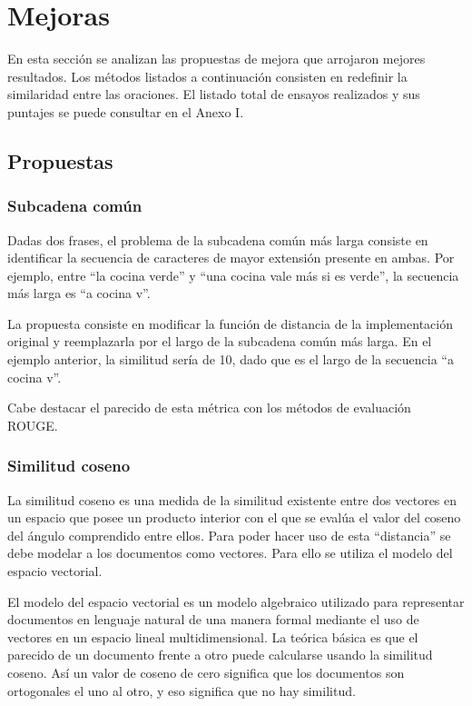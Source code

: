 \documentclass[a4paper]{article}
\begin{document}
\section{Mejoras}
En esta sección se analizan las propuestas de mejora que arrojaron mejores resultados. Los métodos listados a continuación consisten en redefinir la similaridad entre las oraciones. El listado total de ensayos realizados y sus puntajes se puede consultar en el Anexo I.

\subsection{Propuestas}

\subsubsection{Subcadena común}
Dadas dos frases, el problema de la subcadena común más larga consiste en identificar la secuencia de caracteres de mayor extensión presente en ambas. Por ejemplo, entre “la cocina verde” y “una cocina vale más si es verde”, la secuencia más larga es “a cocina v”.

La propuesta consiste en modificar la función de distancia de la implementación original y reemplazarla por el largo de la subcadena común más larga. En el ejemplo anterior, la similitud sería de 10, dado que es el largo de la secuencia “a cocina v”.

Cabe destacar el parecido de esta métrica con los métodos de evaluación ROUGE.


\subsubsection{Similitud coseno}
La similitud coseno es una medida de la similitud existente entre dos vectores en un espacio que posee un producto interior con el que se evalúa el valor del coseno del ángulo comprendido entre ellos. Para poder hacer uso de esta “distancia” se debe modelar a los documentos como vectores. Para ello se utiliza el modelo del espacio vectorial.

El modelo del espacio vectorial es un modelo algebraico utilizado para representar documentos en lenguaje natural de una manera formal mediante el uso de vectores en un espacio lineal multidimensional. La teórica básica es que el parecido de un documento frente a otro puede calcularse usando la similitud coseno. Así un valor de coseno de cero significa que los documentos son ortogonales el uno al otro, y eso significa que no hay similitud.
\end{document}

